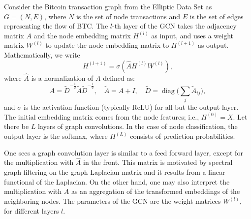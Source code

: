 \documentclass[sigconf,submission]{acmart}
\DeclareMathOperator{\diag}{diag}
\begin{document}
Consider the Bitcoin transaction graph from the Elliptic Data Set as $G=(N,E)$, where $N$ is the set of node transactions and $E$ is the set of edges representing the flow of BTC. The $l$-th layer of the GCN takes the adjacency matrix $A$ and the node embedding matrix $H^{(l)}$ as input, and uses a weight matrix $W^{(l)}$ to update the node embedding matrix to $H^{(l+1)}$ as output. Mathematically, we write
\begin{equation}
  H^{(l+1)} =  \sigma(\widehat{A} H^{(l)} W^{(l)}), \label{eqn:gcn}
\end{equation}
where $\widehat{A}$ is a normalization of $A$ defined as:
\[
\widehat{A}=\widetilde{D}^{-\frac{1}{2}}\widetilde{A}\widetilde{D}^{-\frac{1}{2}},
\quad \widetilde{A}=A+I,
\quad \widetilde{D}=\diag\Bigg(\sum_j\widetilde{A}_{ij}\Bigg),
\]
and $\sigma$ is the activation function (typically ReLU) for all but the output layer. The initial embedding matrix comes from the node features; i.e., $H^{(0)}=X$. Let there be $L$ layers of graph convolutions. In the case of node classification, the output layer is the softmax, where $H^{(L)}$ consists of prediction probabilities.

One sees a graph convolution layer is similar to a feed forward layer, except for the multiplication with $\widehat{A}$ in the front. This matrix is motivated by spectral graph filtering on the graph Laplacian matrix and it results from a linear functional of the Laplacian. On the other hand, one may also interpret the multiplication with $\widehat{A}$ as an aggregation of the transformed embeddings of the neighboring nodes.
The parameters of the GCN are the weight matrices $W^{(l)}$, for different layers $l$. 



\end{document}
